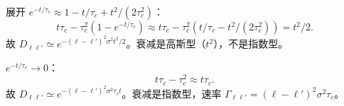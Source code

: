 \begin{derivation}[相关噪声的短时与长时极限]
展开 $e^{-t/\tau_c}\approx 1-t/\tau_c+t^2/(2\tau_c^2)$：
\begin{equation}
t\tau_c-\tau_c^2(1-e^{-t/\tau_c})\approx t\tau_c-\tau_c^2(t/\tau_c-t^2/(2\tau_c^2))=t^2/2.
\end{equation}
故 $D_{\ell\ell'}\simeq e^{-(\ell-\ell')^2\sigma^2t^2/2}$。衰减是高斯型（$t^2$），不是指数型。

$e^{-t/\tau_c}\to 0$：
\begin{equation}
t\tau_c-\tau_c^2\approx t\tau_c.
\end{equation}
故 $D_{\ell\ell'}\simeq e^{-(\ell-\ell')^2\sigma^2\tau_c t}$。衰减是指数型，速率 $\Gamma_{\ell\ell'}=(\ell-\ell')^2\sigma^2\tau_c$。

\end{derivation}
